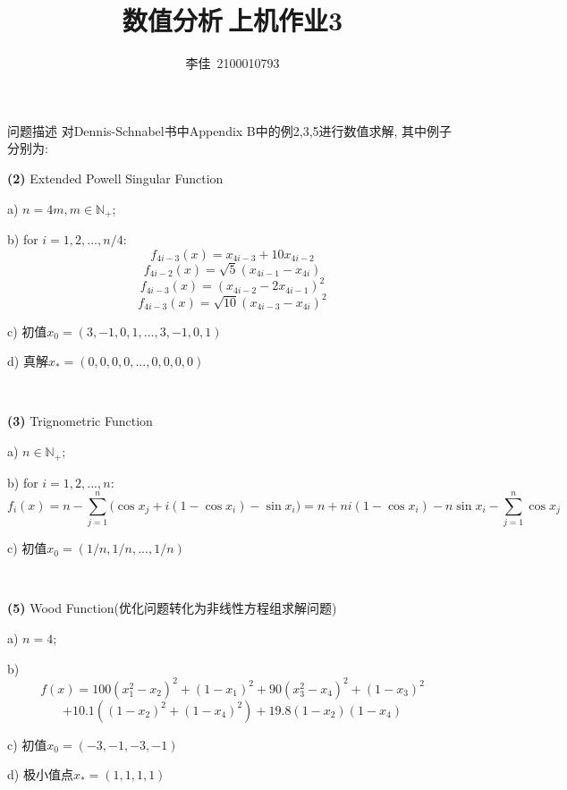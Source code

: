 \documentclass{article}
\title{\textbf{数值分析$\ $上机作业3}}
\author{李佳~2100010793}
\date{}
\begin{document}
\maketitle
\begin{section}{问题描述}
    对Dennis-Schnabel书中Appendix B中的例2,3,5进行数值求解, 其中例子分别为:
    
    \noindent\textbf{(2)} Extended Powell Singular Function
    
    a) $n=4m,m\in\mathbb{N}_+$;

    b) for $i=1,2,...,n/4$:
    $$f_{4i-3}(x) = x_{4i-3}+10x_{4i-2}$$
    $$f_{4i-2}(x) = \sqrt{5}(x_{4i-1}-x_{4i})$$
    $$f_{4i-3}(x) = (x_{4i-2}-2x_{4i-1})^2$$
    $$f_{4i-3}(x) = \sqrt{10}(x_{4i-3}-x_{4i})^2$$

    c) 初值$x_0=(3,-1,0,1,...,3,-1,0,1)$

    d) 真解$x_{\ast} = (0,0,0,0,...,0,0,0,0)$

\

    \noindent\textbf{(3)} Trignometric Function

    a) $n\in\mathbb{N}_+$;

    b) for $i=1,2,...,n$:
    $$f_i(x) = n-\sum_{j=1}^n\bigg(\cos x_j + i(1-\cos x_i) -\sin x_i \bigg) = n + ni(1-\cos x_i)-n\sin x_i -\sum_{j=1}^n\cos x_j$$

    c) 初值$x_0=(1/n,1/n,...,1/n)$

\

    \noindent\textbf{(5)} Wood Function(优化问题转化为非线性方程组求解问题)

    a) $n=4$;

    b) $$f(x)=100(x_1^2-x_2)^2+(1-x_1)^2+90(x_3^2-x_4)^2+(1-x_3)^2 $$
         $$+ 10.1((1-x_2)^2+(1-x_4)^2)+19.8(1-x_2)(1-x_4)$$

    c) 初值$x_0=(-3,-1,-3,-1)$

    d) 极小值点$x_\ast = (1,1,1,1)$
\end{section}
\end{document}
